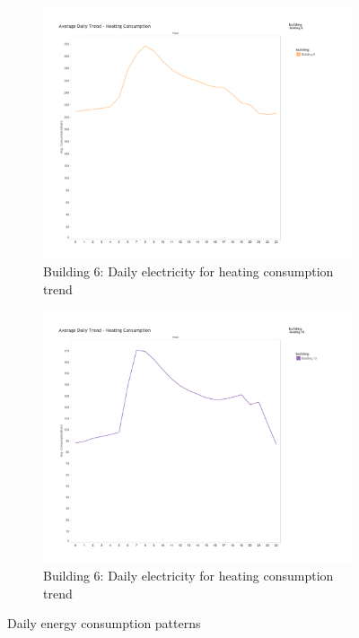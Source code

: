 \begin{figure}
        \begin{subfigure}[b]{0.45\textwidth}
                \includegraphics[width=\textwidth]{images/db6_heat}
                \caption{Building 6: Daily electricity for heating consumption trend}
                \label{fig:heat6}
        \end{subfigure}
        \begin{subfigure}[b]{0.45\textwidth}
                        \includegraphics[width=\textwidth]{images/db13_heat}
                        \caption{Building 6: Daily electricity for heating consumption trend}
                        \label{fig:heat13}
       \end{subfigure}
     \caption{Daily energy consumption patterns}\label{fig:animals}
\end{figure}

